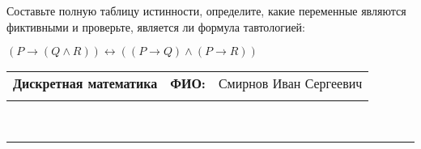 \documentclass[10pt]{exam}
\newcommand{\class}{Дискретная математика}
\newcommand{\examdate}{}
\begin{document}
\begin{questions}
\begin{enumerate}[a)]
\end{enumerate}\question Составьте полную таблицу истинности, определите, какие переменные являются фиктивными и проверьте, является ли формула тавтологией:

$(P \rightarrow (Q \land R)) \leftrightarrow ((P \rightarrow Q) \land (P \rightarrow R))$

\end{questions}
\newpage
\begin{flushright}
\begin{tabular}{p{2.8in} r l}
\textbf{\class} & \textbf{ФИО:} &Смирнов Иван Сергеевич
\\

\textbf{\examdate} &&\\
\end{tabular}\\
\end{flushright}
\rule[1ex]{\textwidth}{.1pt}
\end{document}
